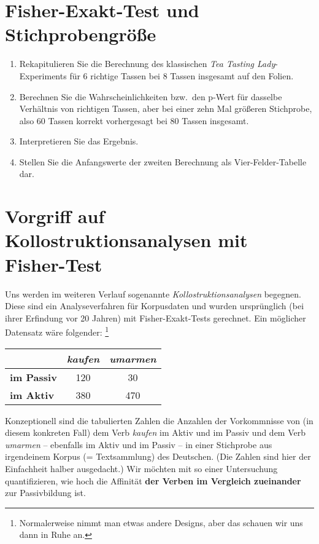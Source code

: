 \section{Fisher-Exakt-Test und Stichprobengröße}

\begin{enumerate}\Lf
  \item Rekapitulieren Sie die Berechnung des klassischen \textit{Tea Tasting Lady}-Experiments für 6 richtige Tassen bei 8 Tassen insgesamt auf den Folien.
  \item Berechnen Sie die Wahrscheinlichkeiten bzw.\ den p-Wert für dasselbe Verhältnis von richtigen Tassen, aber bei einer zehn Mal größeren Stichprobe, also 60 Tassen korrekt vorhergesagt bei 80 Tassen insgesamt.
  \item Interpretieren Sie das Ergebnis.
  \item Stellen Sie die Anfangswerte der zweiten Berechnung als Vier-Felder-Tabelle dar.
\end{enumerate}


\section{Vorgriff auf Kollostruktionsanalysen mit Fisher-Test}

Uns werden im weiteren Verlauf sogenannte \textit{Kollostruktionsanalysen} begegnen.
Diese sind ein Analyseverfahren für Korpusdaten und wurden ursprünglich (bei ihrer Erfindung vor 20 Jahren) mit Fisher-Exakt-Tests gerechnet.
Ein möglicher Datensatz wäre folgender:%
\footnote{Normalerweise nimmt man etwas andere Designs, aber das schauen wir uns dann in Ruhe an.}

\begin{center}
\begin{tabular}[h]{|l|c|c|}
  \cline{2-3}
  \multicolumn{1}{c|}{} & \textbf{\textit{kaufen}} & \textbf{\textit{umarmen}} \\\hline
  \textbf{im Passiv} & 120 & 30 \\\hline
  \textbf{im Aktiv} & 380 & 470 \\\hline
\end{tabular}
\end{center}

Konzeptionell sind die tabulierten Zahlen die Anzahlen der Vorkommnisse von (in diesem konkreten Fall) dem Verb \textit{kaufen} im Aktiv und im Passiv und dem Verb \textit{umarmen} -- ebenfalls im Aktiv und im Passiv -- in einer Stichprobe aus irgendeinem Korpus (= Textsammlung) des Deutschen.
(Die Zahlen sind hier der Einfachheit halber ausgedacht.)
Wir möchten mit so einer Untersuchung quantifizieren, wie hoch die Affinität \textbf{der Verben im Vergleich zueinander} zur Passivbildung ist.

